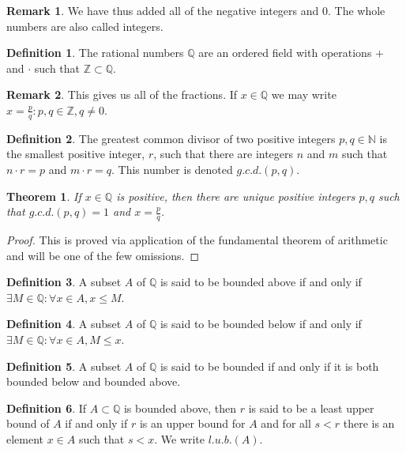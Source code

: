 \documentclass[oneside]{book}
\newtheorem{theorem}{Theorem}[section]
\theoremstyle{definition}
\newtheorem{definition}{Definition}[section]
\newtheorem{remark}{Remark}[section]
\begin{document}
\begin{remark}
We have thus added all of the negative integers and $0$. The whole numbers are also called integers.
\end{remark}

\begin{definition}
The rational numbers $\mathbb{Q}$ are an ordered field with operations $+$ and $\cdot$ such that $\mathbb{Z}\subset \mathbb{Q}$.
\end{definition}

\begin{remark}
This gives us all of the fractions. If $x\in \mathbb{Q}$ we may write $x= \frac{p}{q}:p,q\in \mathbb{Z}, q\ne 0$.
\end{remark}

\begin{definition}
The greatest common divisor of two positive integers $p,q\in \mathbb{N}$ is the smallest positive integer, $r$, such that there are integers $n$ and $m$ such that $n\cdot r = p$ and $m\cdot r = q$. This number is denoted $g.c.d.(p,q)$.
\end{definition}

\begin{theorem}
If $x\in \mathbb{Q}$ is positive, then there are unique positive integers $p, q$ such that $g.c.d.(p,q)=1$ and $x=\frac{p}{q}$.
\end{theorem}
\begin{proof}
This is proved via application of the fundamental theorem of arithmetic and will be one of the few omissions.
\end{proof}

\begin{definition}
A subset $A$ of $\mathbb{Q}$ is said to be bounded above if and only if $\exists M\in \mathbb{Q}: \forall x\in A,x \leq M$.
\end{definition}

\begin{definition}
A subset $A$ of $\mathbb{Q}$ is said to be bounded below if and only if $\exists M\in \mathbb{Q}:\forall x\in A,M\leq x$. 
\end{definition}

\begin{definition}
A subset $A$ of $\mathbb{Q}$ is said to be bounded if and only if it is both bounded below and bounded above.
\end{definition}

\begin{definition}
If $A\subset \mathbb{Q}$ is bounded above, then $r$ is said to be a least upper bound of $A$ if and only if $r$ is an upper bound for $A$ and for all $s<r$ there is an element $x\in A$ such that $s<x$. We write $l.u.b.(A)$.
\end{definition}
\end{document}
